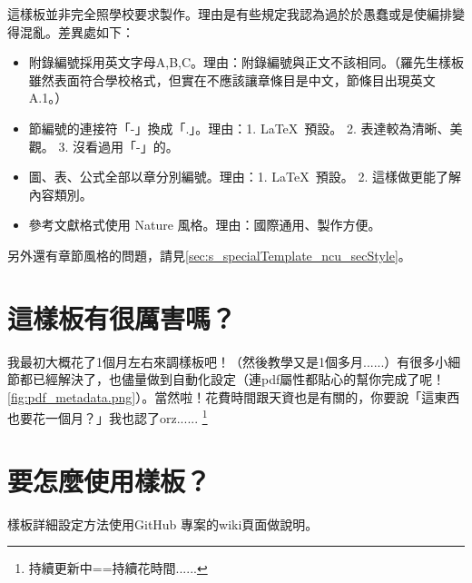 \documentclass[class=NCU_thesis, crop=false, float=true]{standalone}
\begin{document}
這樣板並非完全照學校要求製作。理由是有些規定我認為過於於愚蠢或是使編排變得混亂。差異處如下：
\begin{itemize}
    \item 附錄編號採用英文字母A,B,C。理由：附錄編號與正文不該相同。（羅先生樣板雖然表面符合學校格式，但實在不應該讓章條目是中文，節條目出現英文A.1。）
    \item 節編號的連接符「-」換成「.」。理由：1. \LaTeX\ 預設。 2. 表達較為清晰、美觀。 3. 沒看過用「-」的。
    \item 圖、表、公式全部以章分別編號。理由：1. \LaTeX\ 預設。 2. 這樣做更能了解內容類別。
    \item 參考文獻格式使用 Nature 風格。理由：國際通用、製作方便。
\end{itemize}
另外還有章節風格的問題，請見\cref{sec:s_specialTemplate_ncu_secStyle}。

\section{這樣板有很厲害嗎？}
我最初大概花了1個月左右來調樣板吧！（然後教學又是1個多月......）有很多小細節都已經解決了，也儘量做到自動化設定（連pdf屬性都貼心的幫你完成了呢！\cref{fig:pdf_metadata.png}）。當然啦！花費時間跟天資也是有關的，你要說「這東西也要花一個月？」我也認了orz......
\footnote{持續更新中==持續花時間......}

\section{要怎麼使用樣板？}
{\color{red}
    樣板詳細設定方法使用GitHub 專案的wiki頁面做說明。
}
\end{document}
